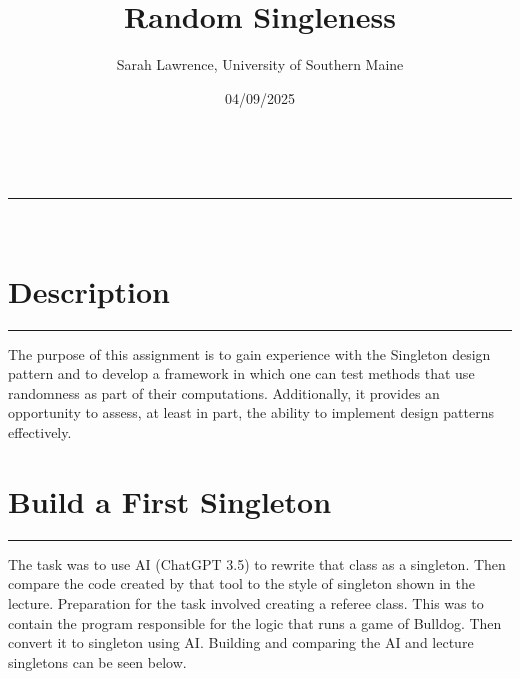 \documentclass[a4paper,11pt]{article}
\makeatletter
\newcommand{\linia}{\rule{\linewidth}{0.5pt}}
\renewcommand{\maketitle}{
\begin{center}
\vspace{2ex}
{\huge \textsc{\@title}}
\vspace{1ex}
\\
\linia\\
\@author \hfill \@date
\vspace{4ex}
\end{center}
}
\makeatother
\begin{document}
\title{Random Singleness}

\author{Sarah Lawrence, University of Southern Maine}

\date{04/09/2025}

\maketitle

\section*{Description}
\hrule
\vspace{13pt} %
The purpose of this assignment is to gain experience with the Singleton design pattern and to develop a framework in which one can test methods that use randomness as part of their computations. Additionally, it provides an opportunity to assess, at least in part, the ability to implement design patterns effectively.


\section*{Build a First Singleton}
\hrule
\vspace{10pt} %
The task was to use AI (ChatGPT 3.5) to rewrite that class as a singleton. Then compare the code created by that tool to the style of singleton shown in the lecture. Preparation for the task involved creating a referee class. This was to contain the program responsible for the logic that runs a game of Bulldog. Then convert it to singleton using AI. Building and comparing the AI and lecture singletons can be seen below.

\vspace{5pt} %
\end{document}
